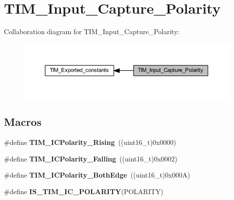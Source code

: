 \hypertarget{group___t_i_m___input___capture___polarity}{}\section{T\+I\+M\+\_\+\+Input\+\_\+\+Capture\+\_\+\+Polarity}
\label{group___t_i_m___input___capture___polarity}
Collaboration diagram for T\+I\+M\+\_\+\+Input\+\_\+\+Capture\+\_\+\+Polarity\+:\nopagebreak
\begin{figure}[H]
\begin{center}
\leavevmode
\includegraphics[width=350pt]{group___t_i_m___input___capture___polarity}
\end{center}
\end{figure}
\subsection*{Macros}
\begin{DoxyCompactItemize}
\item 
\mbox{\label{group___t_i_m___input___capture___polarity_gabe598596b7dbcac446a4918105fa95a6}} 
\#define {\bfseries T\+I\+M\+\_\+\+I\+C\+Polarity\+\_\+\+Rising}~((uint16\+\_\+t)0x0000)
\item 
\mbox{\label{group___t_i_m___input___capture___polarity_ga70c6f5ed30a236bac4c690928e742243}} 
\#define {\bfseries T\+I\+M\+\_\+\+I\+C\+Polarity\+\_\+\+Falling}~((uint16\+\_\+t)0x0002)
\item 
\mbox{\label{group___t_i_m___input___capture___polarity_ga4632a6425d407c0d28b610b2d31cccc8}} 
\#define {\bfseries T\+I\+M\+\_\+\+I\+C\+Polarity\+\_\+\+Both\+Edge}~((uint16\+\_\+t)0x000\+A)
\item 
\#define {\bfseries I\+S\+\_\+\+T\+I\+M\+\_\+\+I\+C\+\_\+\+P\+O\+L\+A\+R\+I\+TY}(P\+O\+L\+A\+R\+I\+TY)
\end{DoxyCompactItemize}


